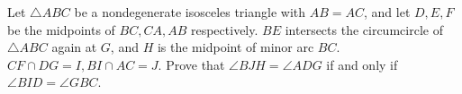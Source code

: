 Let $\triangle ABC$ be a nondegenerate isosceles triangle with $AB=AC$, and let $D, E, F$ be the midpoints of $BC, CA, AB$ respectively. $BE$ intersects the circumcircle of $\triangle ABC$ again at $G$, and $H$ is the midpoint of minor arc $BC$. $CF\cap DG=I, BI\cap AC=J$. Prove that $\angle BJH=\angle ADG$ if and only if $\angle BID=\angle GBC$.

